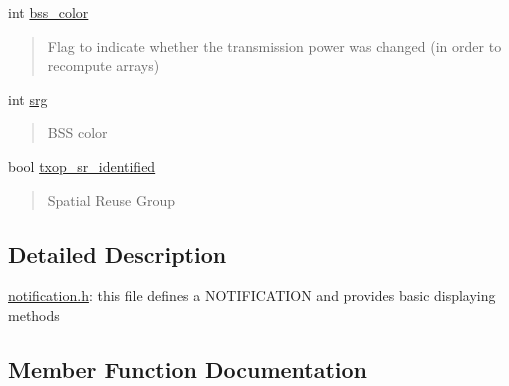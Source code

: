 \begin{DoxyCompactItemize}
\mbox{\label{structTxInfo_ab5131a1d020a34250eee17e96167bbca}} 
int \hyperlink{structTxInfo_ab5131a1d020a34250eee17e96167bbca}{bss\+\_\+color}
\begin{DoxyCompactList}\small\item\em \begin{quote}
Flag to indicate whether the transmission power was changed (in order to recompute arrays) \end{quote}
\end{DoxyCompactList}\item 
\mbox{\label{structTxInfo_ae0acd2612febbe77a6e8392ddfdfb558}} 
int \hyperlink{structTxInfo_ae0acd2612febbe77a6e8392ddfdfb558}{srg}
\begin{DoxyCompactList}\small\item\em \begin{quote}
B\+SS color \end{quote}
\end{DoxyCompactList}\item 
\mbox{\label{structTxInfo_a3c6d78fa5ceb025d442e1cccaac1c0ba}} 
bool \hyperlink{structTxInfo_a3c6d78fa5ceb025d442e1cccaac1c0ba}{txop\+\_\+sr\+\_\+identified}
\begin{DoxyCompactList}\small\item\em \begin{quote}
Spatial Reuse Group \end{quote}
\end{DoxyCompactList}\end{DoxyCompactItemize}


\subsection{Detailed Description}
\hyperlink{notification_8h_source}{notification.\+h}\+: this file defines a N\+O\+T\+I\+F\+I\+C\+A\+T\+I\+ON and provides basic displaying methods 

\subsection{Member Function Documentation}
\mbox{\label{structTxInfo_a5766aada8a87f763cfdfcaee1016bbe4}} 
